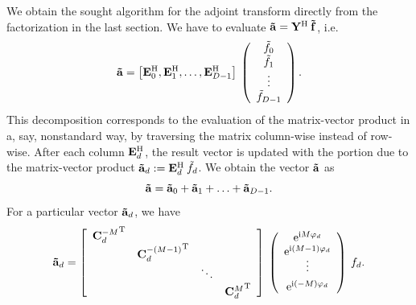 We obtain the sought algorithm for the adjoint transform directly from the factorization 
in the last section. We have to evaluate $\mathbf{\tilde{a}} = \mathbf{Y}^{\text{\rm{H}}} \: \mathbf{\tilde{f}}$, i.e.
\begin{equation}
  \label{NFSFT:adjointNDSFTFactorization2}
  \mathbf{\tilde{a}}
  =
  \left[
    \mathbf{E}_{0}^{\text{\rm{H}}},
    \mathbf{E}_{1}^{\text{\rm{H}}},
    \ldots,
    \mathbf{E}_{D-1}^{\text{\rm{H}}}
  \right]
  \:
  \left(\begin{array}{c}
    \tilde{f}_{0}\\
    \tilde{f}_{1}\\
    \vdots\\
    \tilde{f}_{D-1}
  \end{array}\right). 
\end{equation}
This decomposition corresponds to the evaluation of the matrix-vector product in a, say, nonstandard 
way, by traversing the 
matrix column-wise instead of row-wise. After each column $\mathbf{E}_{d}^{\text{\rm{H}}}$, the result vector is updated with the portion due 
to the matrix-vector product $\mathbf{\tilde{a}}_{d} := \mathbf{E}^{\text{\rm{H}}}_{d} \: \tilde{f}_{d}$. We obtain the vector $\mathbf{\tilde{a}}$ as
\begin{equation}
  \label{}
  \mathbf{\tilde{a}} = \mathbf{\tilde{a}}_{0} + \mathbf{\tilde{a}}_{1} + \ldots + \mathbf{\tilde{a}}_{D-1}.
\end{equation}
For a particular vector $\mathbf{\tilde{a}}_{d}$, we have
\begin{equation}
  \label{NFSFT:adjointNDSFTFactorization}
  \mathbf{\tilde{a}}_{d}
  =
  \left[\begin{array}{cccc}
    {\mathbf{C}^{-M}_{d}}^{\text{\rm{T}}} &                               &        &                           \\
                              & {\mathbf{C}^{-(M-1)}_{d}}^{\text{\rm{T}}} &        &                           \\
                              &                                & \ddots &                           \\
                              &                                &        & {\mathbf{C}^{M}_{d}}^{\text{\rm{T}}} 
  \end{array}\right]
  \:
  \left(\begin{array}{c}
    \mbox{\rm{e}}^{\mbox{\scriptsize\rm{i}} M \varphi_{d}}\\
    \mbox{\rm{e}}^{\mbox{\scriptsize\rm{i}} (M-1) \varphi_{d}}\\[-1ex]
    \vdots\\[1ex]
    \mbox{\rm{e}}^{\mbox{\scriptsize\rm{i}} (-M) \varphi_{d}}
  \end{array}\right)
  \:
  f_{d}.
\end{equation}
